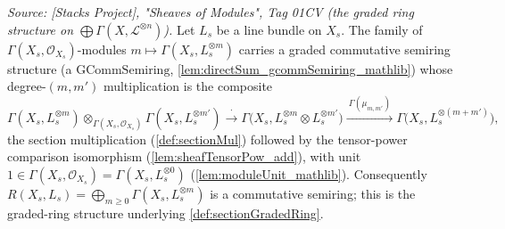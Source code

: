 \begin{lemma}
  \label{lem:sectionGradedRing_gcommSemiring}
  \textit{Source: [Stacks Project], "Sheaves of Modules", Tag 01CV (the graded
  ring structure on \(\bigoplus \Gamma(X,\mathcal{L}^{\otimes n})\)).}
  Let \(L_s\) be a line bundle on \(X_s\). The family of
  \(\Gamma(X_s,\mathcal{O}_{X_s})\)-modules
  \(m \mapsto \Gamma(X_s, L_s^{\otimes m})\) carries a graded commutative
  semiring structure (a \(\mathrm{GCommSemiring}\),
  \cref{lem:directSum_gcommSemiring_mathlib}) whose degree-\((m,m')\)
  multiplication is the composite
  \[
    \Gamma(X_s, L_s^{\otimes m}) \otimes_{\Gamma(X_s,\mathcal{O}_{X_s})}
      \Gamma(X_s, L_s^{\otimes m'})
    \xrightarrow{\ \cdot\ }
    \Gamma\bigl(X_s, L_s^{\otimes m} \otimes L_s^{\otimes m'}\bigr)
    \xrightarrow{\ \Gamma(\mu_{m,m'})\ }
    \Gamma\bigl(X_s, L_s^{\otimes (m+m')}\bigr),
  \]
  the section multiplication (\cref{def:sectionMul}) followed by the
  tensor-power comparison isomorphism (\cref{lem:sheafTensorPow_add}), with unit
  \(1 \in \Gamma(X_s, \mathcal{O}_{X_s}) = \Gamma(X_s, L_s^{\otimes 0})\)
  (\cref{lem:moduleUnit_mathlib}). Consequently
  \(R(X_s, L_s) = \bigoplus_{m \ge 0} \Gamma(X_s, L_s^{\otimes m})\) is a
  commutative semiring; this is the graded-ring structure underlying
  \cref{def:sectionGradedRing}.
\end{lemma}

